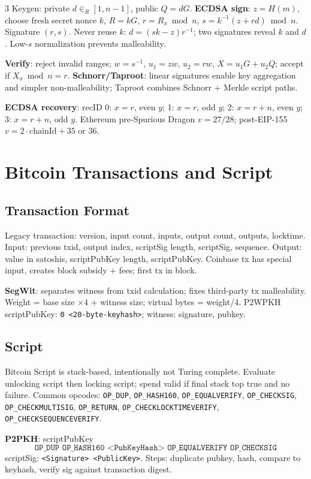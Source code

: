 \documentclass[8pt]{extarticle}
\newcommand{\term}[1]{\textbf{#1}}
\newcommand{\tightbox}[1]{\colorbox{boxc}{\parbox{0.985\linewidth}{#1}}}
\begin{document}
\begin{multicols*}{3}
Keygen: private $d\in_R[1,n-1]$, public $Q=dG$. \term{ECDSA sign}: $z=H(m)$, choose fresh secret nonce $k$, $R=kG$, $r=R_x\bmod n$, $s=k^{-1}(z+rd)\bmod n$. Signature $(r,s)$. Never reuse $k$: $d=(sk-z)r^{-1}$; two signatures reveal $k$ and $d$. Low-$s$ normalization prevents malleability.

\term{Verify}: reject invalid ranges; $w=s^{-1}$, $u_1=zw$, $u_2=rw$, $X=u_1G+u_2Q$; accept if $X_x\bmod n=r$. \term{Schnorr/Taproot}: linear signatures enable key aggregation and simpler non-malleability; Taproot combines Schnorr + Merkle script paths.

\tightbox{\term{ECDSA recovery}: recID 0: $x=r$, even $y$; 1: $x=r$, odd $y$; 2: $x=r+n$, even $y$; 3: $x=r+n$, odd $y$. Ethereum pre-Spurious Dragon $v=27/28$; post-EIP-155 $v=2\cdot\text{chainId}+35$ or $36$.}

\section{Bitcoin Transactions and Script}
\subsection{Transaction Format}
Legacy transaction: version, input count, inputs, output count, outputs, locktime. Input: previous txid, output index, scriptSig length, scriptSig, sequence. Output: value in satoshis, scriptPubKey length, scriptPubKey. Coinbase tx has special input, creates block subsidy + fees; first tx in block.

\term{SegWit}: separates witness from txid calculation; fixes third-party tx malleability. Weight = base size $\times4$ + witness size; virtual bytes = weight/4. P2WPKH scriptPubKey: \texttt{0 <20-byte-keyhash>}; witness: signature, pubkey.

\subsection{Script}
Bitcoin Script is stack-based, intentionally not Turing complete. Evaluate unlocking script then locking script; spend valid if final stack top true and no failure. Common opcodes: \texttt{OP\_DUP}, \texttt{OP\_HASH160}, \texttt{OP\_EQUALVERIFY}, \texttt{OP\_CHECKSIG}, \texttt{OP\_CHECKMULTISIG}, \texttt{OP\_RETURN}, \texttt{OP\_CHECKLOCKTIMEVERIFY}, \texttt{OP\_CHECKSEQUENCEVERIFY}.

\term{P2PKH}: scriptPubKey
\[
\texttt{OP\_DUP OP\_HASH160 <PubKeyHash> OP\_EQUALVERIFY OP\_CHECKSIG}
\]
scriptSig: \texttt{<Signature> <PublicKey>}. Steps: duplicate pubkey, hash, compare to keyhash, verify sig against transaction digest.


\end{multicols*}
\end{document}
